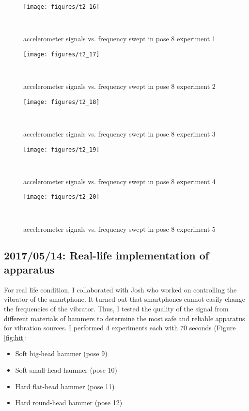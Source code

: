 \documentclass{sigchi}
\begin{document}
\begin{figure*}
  \centering
  \texttt{[image: figures/t2\_16]}
  \caption{accelerometer signals vs. frequency swept in pose 8 experiment 1}
    ~\label{fig:t2_16}
\end{figure*}

\begin{figure*}
  \centering
  \texttt{[image: figures/t2\_17]}
  \caption{accelerometer signals vs. frequency swept in pose 8 experiment 2}
    ~\label{fig:t2_17}
\end{figure*}

\begin{figure*}
  \centering
  \texttt{[image: figures/t2\_18]}
  \caption{accelerometer signals vs. frequency swept in pose 8 experiment 3}
    ~\label{fig:t2_18}
\end{figure*}

\begin{figure*}
  \centering
  \texttt{[image: figures/t2\_19]}
  \caption{accelerometer signals vs. frequency swept in pose 8 experiment 4}
    ~\label{fig:t2_19}
\end{figure*}

\begin{figure*}
  \centering
  \texttt{[image: figures/t2\_20]}
  \caption{accelerometer signals vs. frequency swept in pose 8 experiment 5}
    ~\label{fig:t2_20}
\end{figure*}

\subsection{2017/05/14: Real-life implementation of apparatus} 

For real life condition, I collaborated with Josh who worked on controlling the vibrator of the smartphone. It turned out that smartphones cannot easily change the frequencies of the vibrator. Thus, I tested the quality of the signal from different materials of hammers to determine the most safe and reliable apparatus for vibration sources. I performed 4 experiments each with 70 seconds (Figure \ref{fig:hit}: 
\begin{itemize}
\item Soft big-head hammer (pose 9)
\item Soft small-head hammer (pose 10)
\item Hard flat-head hammer (pose 11)
\item Hard round-head hammer (pose 12)
\end{itemize}
\end{document}

